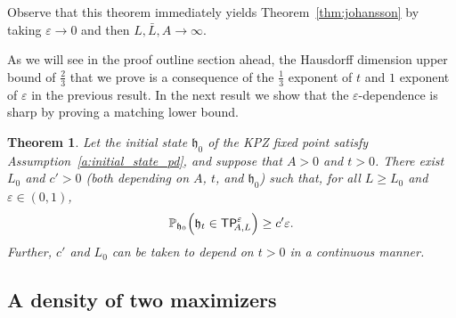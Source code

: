 \documentclass[oneside,final,11pt]{amsart}
\newtheorem{thm}{Theorem}[section]
\theoremstyle{definition}
\newcommand{\fh}{\mathfrak{h}}
\newcommand{\TP}[1]{\mathsf{TP}_{\!\!#1}}
\newcommand{\bJ}{\mathsf{J}}
\newcommand{\R}{\mathbb{R}}
\newcommand{\CT}{\mathcal{T}}
\newcommand{\1}[1]{\mathbf{1}_{#1}}
\newcommand{\eps}{\varepsilon}
\newcommand{\km}[1]{\marginnote{\tiny{\color{red}[KM: #1]}}}
\newcommand{\kmtext}[1]{{\color{red}[KM:#1]}}
\newcommand{\mh}[1]{\marginnote{\tiny{\color{blue}[MH: #1]}}}
\newcommand{\smallconst}{c'}
\newcommand{\uptext}[1]{\text{\upshape{#1}}}
\DeclareMathOperator{\UC}{\uptext{UC}}
\renewcommand{\P}{\mathbb P}
\numberwithin{equation}{section}
\begin{document}
Observe that this theorem immediately yields Theorem~\ref{thm:johansson} by taking $\varepsilon\to0$ and then $L,\bar L, A\to\infty$.


As we will see in the proof outline section ahead, the Hausdorff dimension upper bound of $\frac{2}{3}$ that we prove is a consequence of the $\frac{1}{3}$ exponent of $t$ and $1$ exponent of $\varepsilon$ in the previous result. In the next result we show that the $\varepsilon$-dependence is sharp by proving a matching lower bound.%

\begin{thm}\label{thm:TP_probability}
    Let the initial state $\fh_0$ of the KPZ fixed point satisfy Assumption~\ref{a:initial_state_pd}, and suppose that $A>0$ and $t>0$. There exist $L_0$ and $\smallconst > 0$ (both depending on $A$, $t$, and $\fh_0$) such that, for all $L\geq L_0$ and $\eps \in (0,1)$,
    \begin{equation}
        \P_{\fh_0} \Bigl(\fh_t \in \TP{A, L}^{\eps}\Bigr) \geq \smallconst \eps.
    \end{equation}
    Further, $\smallconst$ and $L_0$ can be taken to depend on $t>0$ in a continuous manner.
\end{thm}




\subsection{A density of two maximizers}
\end{document}
